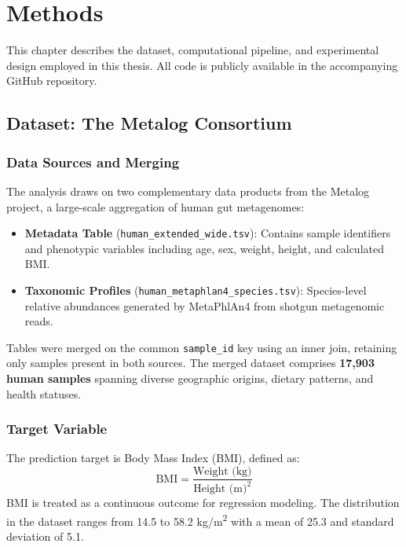 
\chapter{Methods}
\label{ch:methods}

This chapter describes the dataset, computational pipeline, and experimental design employed in this thesis. All code is publicly available in the accompanying GitHub repository.

\section{Dataset: The Metalog Consortium}

\subsection{Data Sources and Merging}

The analysis draws on two complementary data products from the Metalog project, a large-scale aggregation of human gut metagenomes:

\begin{itemize}
    \item \textbf{Metadata Table} (\texttt{human\_extended\_wide.tsv}): Contains sample identifiers and phenotypic variables including age, sex, weight, height, and calculated BMI.
    \item \textbf{Taxonomic Profiles} (\texttt{human\_metaphlan4\_species.tsv}): Species-level relative abundances generated by MetaPhlAn4 from shotgun metagenomic reads.
\end{itemize}

Tables were merged on the common \texttt{sample\_id} key using an inner join, retaining only samples present in both sources. The merged dataset comprises \textbf{17,903 human samples} spanning diverse geographic origins, dietary patterns, and health statuses.

\subsection{Target Variable}

The prediction target is Body Mass Index (BMI), defined as:
\begin{equation}
\text{BMI} = \frac{\text{Weight (kg)}}{\text{Height (m)}^2}
\end{equation}
BMI is treated as a continuous outcome for regression modeling. The distribution in the dataset ranges from 14.5 to 58.2 kg/m\textsuperscript{2} with a mean of 25.3 and standard deviation of 5.1.

